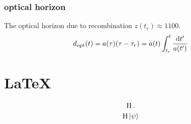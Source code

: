 \subsubsection{optical horizon}

The optical horizon due to recombination $z(t_r) \approx 1100$.
\begin{equation}
    d_{\mathrm{opt}}(t) = a(\tau) \qty(\tau - \tau_r ) = a(t) \int_{t_r}^t \frac{\dd t'}{a(t')}
\end{equation}

\section*{\LaTeX}


\begin{gather}
    \operatorname{H}.\\
    \operatorname{H} \ket{\psi}
\end{gather}




